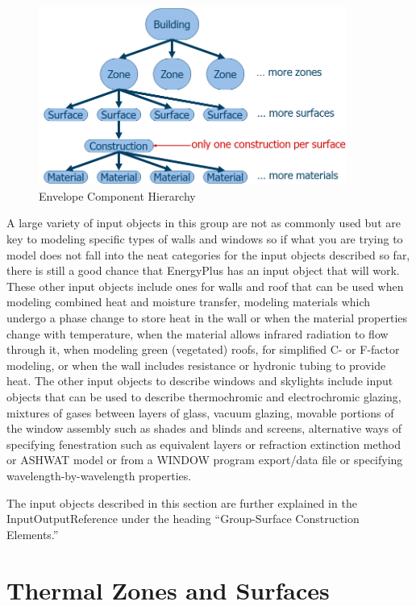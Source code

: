 \begin{figure}[hbtp] 
\centering
\includegraphics[width=0.9\textwidth, height=0.9\textheight, keepaspectratio=true]{media/EnvelopeHierarchy.png}
\caption{Envelope Component Hierarchy}
\end{figure}

A large variety of input objects in this group are not as commonly
used but are key to modeling specific types of walls and windows so
if what you are trying to model does not fall into the neat categories
for the input objects described so far, there is still a good chance
that EnergyPlus has an input object that will work. These other input
objects include ones for walls and roof that can be used when modeling
combined heat and moisture transfer, modeling materials which undergo
a phase change to store heat in the wall or when the material properties
change with temperature, when the material allows infrared radiation
to flow through it, when modeling green (vegetated) roofs, for simplified
C- or F-factor modeling, or when the wall includes resistance or hydronic
tubing to provide heat. The other input objects to describe windows
and skylights include input objects that can be used to describe thermochromic
and electrochromic glazing, mixtures of gases between layers of glass,
vacuum glazing, movable portions of the window assembly such as shades
and blinds and screens, alternative ways of specifying fenestration
such as equivalent layers or refraction extinction method or ASHWAT
model or from a WINDOW program export/data file or specifying wavelength-by-wavelength
properties. 

The input objects described in this section are further explained
in the InputOutputReference under the heading ``Group-Surface Construction
Elements.''

\section{Thermal Zones and Surfaces}


